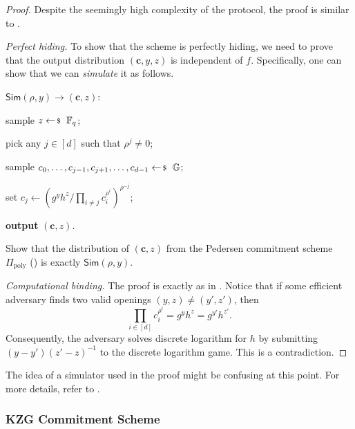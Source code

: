 \documentclass[../../book]{subfiles}
\begin{document}
\begin{proof}
    Despite the seemingly high complexity of the protocol, the proof is similar to .

    \textit{Perfect hiding.} To show that the scheme is perfectly hiding, we need to prove that the output distribution $(\mathbf{c},y,z)$ is independent of $f$.
    Specifically, one can show that we can \emph{simulate} it as follows.

    \underline{$\mathsf{Sim}(\rho,y) \to (\mathbf{c},z):$}
    \begin{algoen}
        \item sample $z \leftarrowS \mathbb{F}_q$;
        \item pick any $j \in [d]$ such that $\rho^j \neq 0$;
        \item sample $c_0,\dots,c_{j-1},c_{j+1},\dots,c_{d-1} \leftarrowS \mathbb{G}$;
        \item set $c_j \gets \left(g^yh^z/\prod_{i \neq j}c_i^{\rho^i}\right)^{\rho^{-j}}$;
        \item \textbf{output} $(\mathbf{c},z)$.
    \end{algoen}

    \begin{exercise}
        Show that the distribution of $(\mathbf{c},z)$ from the Pedersen commitment scheme $\Pi_{\text{poly}}$ () is exactly $\mathsf{Sim}(\rho,y)$.
    \end{exercise}

    \textit{Computational binding.} The proof is exactly as in .
    Notice that if some efficient adversary finds two valid openings $(y,z) \neq (y',z')$, then 
    \begin{equation*}
        \prod_{i \in [d]} c_i^{\rho^i} = g^yh^z = g^{y'}h^{z'}.
    \end{equation*}
    Consequently, the adversary solves discrete logarithm for $h$ by submitting $(y-y')(z'-z)^{-1}$ to the discrete logarithm game.
    This is a contradiction.
\end{proof}

\begin{remark}
    The idea of a simulator used in the proof might be confusing at this point.
    For more details, refer to .
\end{remark}

\subsubsection{KZG Commitment Scheme}
\end{document}
